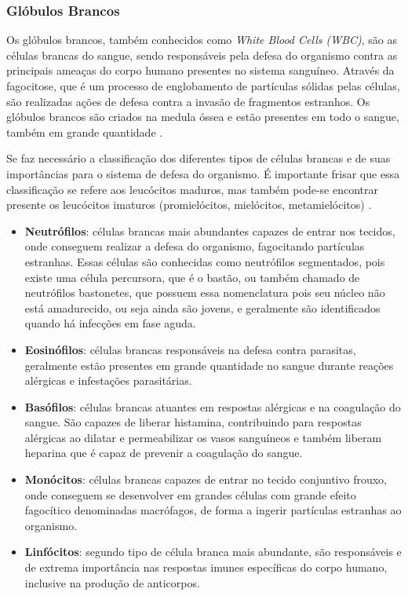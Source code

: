 \subsubsection{Glóbulos Brancos}
Os glóbulos brancos, também conhecidos como \emph{White Blood Cells (WBC)}, são as células brancas do sangue, sendo responsáveis pela defesa do organismo contra as principais ameaças do corpo humano presentes no sistema sanguíneo. Através da fagocitose, que é um processo de englobamento de partículas sólidas pelas células, são realizadas ações de defesa contra a invasão de fragmentos estranhos. Os glóbulos brancos são criados na medula óssea e estão presentes em todo o sangue, também em grande quantidade \cite{manualHematologia}.

Se faz necessário a classificação dos diferentes tipos de células brancas e de suas importâncias para o sistema de defesa do organismo. É importante frisar que essa classificação se refere aos leucócitos maduros, mas também pode-se encontrar presente os leucócitos imaturos (promielócitos, mielócitos, metamielócitos) \cite{manualHematologia}.

\begin{itemize}
	\item \textbf{Neutrófilos}: células brancas mais abundantes capazes de entrar nos tecidos, onde conseguem realizar a defesa do organismo, fagocitando partículas estranhas. Essas células são conhecidas como neutrófilos segmentados, pois existe uma célula percursora, que é o bastão, ou também chamado de neutrófilos bastonetes, que possuem essa nomenclatura pois seu núcleo não está amadurecido, ou seja ainda são jovens, e geralmente são identificados quando há infecções em fase aguda. 
	\item \textbf{Eosinófilos}: células brancas responsáveis na defesa contra parasitas, geralmente estão presentes em grande quantidade no sangue durante reações alérgicas e infestações parasitárias.
	\item \textbf{Basófilos}: células brancas atuantes em respostas alérgicas e na coagulação do sangue. São capazes de liberar histamina, contribuindo para respostas alérgicas ao dilatar e permeabilizar os vasos sanguíneos e também liberam heparina que é capaz de prevenir a coagulação do sangue.
	\item \textbf{Monócitos}: células brancas capazes de entrar no tecido conjuntivo frouxo, onde conseguem se desenvolver em grandes células com grande efeito fagocítico denominadas macrófagos, de forma a ingerir partículas estranhas ao organismo.
	\item \textbf{Linfócitos}: segundo tipo de célula branca mais abundante, são responsáveis e de extrema importância nas respostas imunes específicas do corpo humano, inclusive na produção de anticorpos.
\end{itemize}

